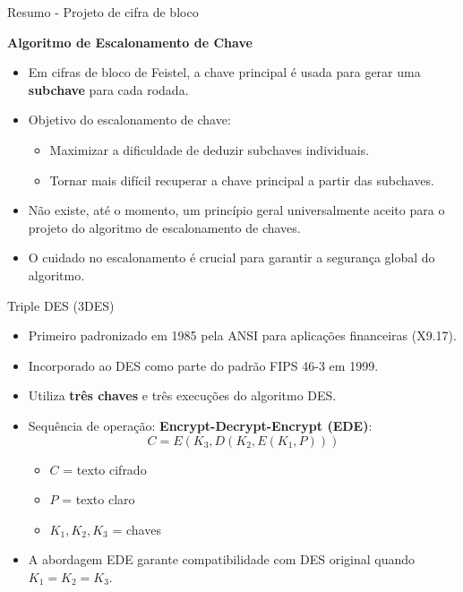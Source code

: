 \begin{frame}{Resumo - Projeto de cifra de bloco}

    \textbf{Algoritmo de Escalonamento de Chave}
    \begin{itemize}
        \item Em cifras de bloco de Feistel, a chave principal é usada para gerar uma \textbf{subchave} para cada rodada.
        \item Objetivo do escalonamento de chave:
              \begin{itemize}
                  \item Maximizar a dificuldade de deduzir subchaves individuais.
                  \item Tornar mais difícil recuperar a chave principal a partir das subchaves.
              \end{itemize}
        \item Não existe, até o momento, um princípio geral universalmente aceito para o projeto do algoritmo de escalonamento de chaves.
        \item O cuidado no escalonamento é crucial para garantir a segurança global do algoritmo.
    \end{itemize}
\end{frame}

\begin{frame}{Triple DES (3DES)}
    \begin{itemize}
        \item Primeiro padronizado em 1985 pela ANSI para aplicações financeiras (X9.17).
        \item Incorporado ao DES como parte do padrão FIPS 46-3 em 1999.
        \item Utiliza \textbf{três chaves} e três execuções do algoritmo DES.
        \item Sequência de operação: \textbf{Encrypt-Decrypt-Encrypt (EDE)}:
              \[
                  C = E(K_3, D(K_2, E(K_1, P)))
              \]
              \begin{itemize}
                  \item $C$ = texto cifrado
                  \item $P$ = texto claro
                  \item $K_1, K_2, K_3$ = chaves
              \end{itemize}
        \item A abordagem EDE garante compatibilidade com DES original quando $K_1 = K_2 = K_3$.
    \end{itemize}
\end{frame}

